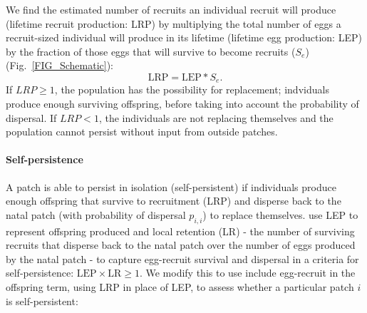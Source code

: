 \documentclass[12pt, oneside]{article}   	%
\begin{document}
We find the estimated number of recruits an individual recruit will produce (lifetime recruit production: LRP) by multiplying the total number of eggs a recruit-sized individual will produce in its lifetime (lifetime egg production: LEP) by the fraction of those eggs that will survive to become recruits ($S_e$) (Fig.\ \ref{FIG_Schematic}):
\begin{equation}
\text{LRP} = \text{LEP} * S_e. \label{EQN_LRP}
\end{equation}
If $LRP \geq 1$, the population has the possibility for replacement; indviduals produce enough surviving offspring, before taking into account the probability of dispersal. If $LRP < 1$, the individuals are not replacing themselves and the population cannot persist without input from outside patches.  %

\paragraph*{Self-persistence}  %

A patch is able to persist in isolation (self-persistent) if individuals produce enough offspring that survive to recruitment (LRP) and disperse back to the natal patch (with probability of dispersal $p_{i,i}$) to replace themselves. \cite{burgess2014beyond} use LEP to represent offspring produced and local retention (LR) - the number of surviving recruits that disperse back to the natal patch over the number of eggs produced by the natal patch - to capture egg-recruit survival and dispersal in a criteria for self-persistence: $\text{LEP} \times \text{LR} \geq 1$. We modify this to use include egg-recruit in the offspring term, using LRP in place of LEP, to assess whether a particular patch $i$ is self-persistent:
\end{document}
